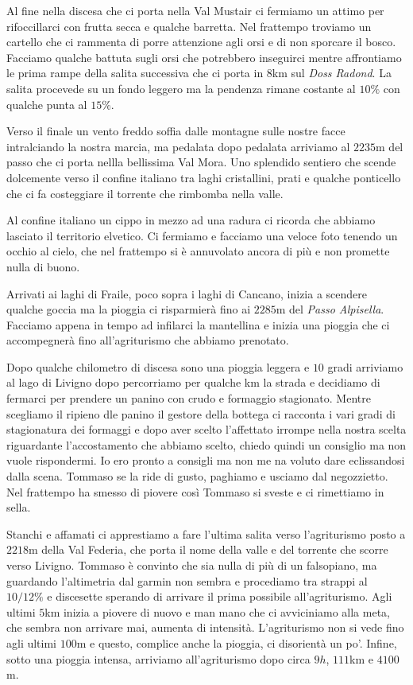 Al fine nella discesa che ci porta nella Val Mustair ci fermiamo un attimo per rifoccillarci con frutta secca e qualche barretta.
Nel frattempo troviamo un cartello che ci rammenta di porre attenzione agli orsi e di non sporcare il bosco.
Facciamo qualche battuta sugli orsi che potrebbero inseguirci mentre affrontiamo le prima rampe della salita successiva che ci porta in $8$km sul \emph{Doss Radond}.
La salita procevede su un fondo leggero ma la pendenza rimane costante al $10\%$ con qualche punta al $15\%$.

Verso il finale un vento freddo soffia dalle montagne sulle nostre facce intralciando la nostra marcia, ma pedalata dopo pedalata arriviamo al $2235$m del passo che ci porta nellla bellissima Val Mora.
Uno splendido sentiero che scende dolcemente verso il confine italiano tra laghi cristallini, prati e qualche ponticello che ci fa costeggiare il torrente che rimbomba nella valle.

Al confine italiano un cippo in mezzo ad una radura ci ricorda che abbiamo lasciato il territorio elvetico.
Ci fermiamo e facciamo una veloce foto tenendo un occhio al cielo, che nel frattempo si è annuvolato ancora di più e non promette nulla di buono.

Arrivati ai laghi di Fraile, poco sopra i laghi di Cancano, inizia a scendere qualche goccia ma la pioggia ci risparmierà fino ai $2285$m del \emph{Passo Alpisella}.
Facciamo appena in tempo ad infilarci la mantellina e inizia una pioggia che ci accompegnerà fino all'agriturismo che abbiamo prenotato.

Dopo qualche chilometro di discesa sono una pioggia leggera e $10$ gradi arriviamo al lago di Livigno dopo percorriamo per qualche km la strada e decidiamo di fermarci per prendere un panino con crudo e formaggio stagionato.
Mentre scegliamo il ripieno dle panino il gestore della bottega ci racconta i vari gradi di stagionatura dei formaggi e dopo aver scelto l'affettato irrompe nella nostra scelta riguardante l'accostamento che abbiamo scelto, chiedo quindi un consiglio ma non vuole rispondermi.
Io ero pronto a consigli ma non me na voluto dare eclissandosi dalla scena.
Tommaso se la ride di gusto, paghiamo e usciamo dal negozzietto.
Nel frattempo ha smesso di piovere così Tommaso si sveste e ci rimettiamo in sella.

Stanchi e affamati ci apprestiamo a fare l'ultima salita verso l'agriturismo posto a $2218$m della Val Federia, che porta il nome della valle e del torrente che scorre verso Livigno.
Tommaso è convinto che sia nulla di più di un falsopiano, ma guardando l'altimetria dal garmin non sembra e procediamo tra strappi al $10/12\%$ e discesette sperando di arrivare il prima possibile all'agriturismo.
Agli ultimi $5$km inizia a piovere di nuovo e man mano che ci avviciniamo alla meta, che sembra non arrivare mai, aumenta di intensità.
L'agriturismo non si vede fino agli ultimi $100$m e questo, complice anche la pioggia, ci disorientà un po'.
Infine, sotto una pioggia intensa, arriviamo all'agriturismo dopo circa $9h$, $111$km e $4100$m.
